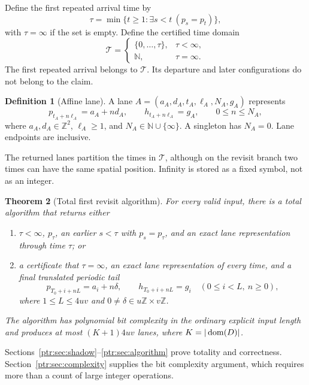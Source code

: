 \documentclass[11pt,letterpaper]{article}
\newtheorem{theorem}{Theorem}[section]
\theoremstyle{definition}\newtheorem{definition}[theorem]{Definition}
\theoremstyle{remark}\newtheorem{remark}[theorem]{Remark}
\newcommand{\Z}{\mathbb Z}\newcommand{\N}{\mathbb N}\newcommand{\Zp}{\mathbb Z_{>0}}
\begin{document}
Define the first repeated arrival time by
\begin{equation}\label{ptr:eq:tau}
 \tau=\min\{t\ge1:\exists s<t\ (p_s=p_t)\},
\end{equation}
with $\tau=\infty$ if the set is empty. Define the certified time domain
\[
 \mathcal T=\begin{cases}\{0,\ldots,\tau\},&\tau<\infty,\\
 \N,&\tau=\infty.
 \end{cases}
\]
The first repeated arrival belongs to $\mathcal T$. Its departure and later configurations do not belong to the claim.

\begin{definition}[Affine lane]\label{ptr:def:lane}
A lane $A=(a_A,d_A,t_A,\ell_A,N_A,g_A)$ represents
\[
 p_{t_A+n\ell_A}=a_A+n d_A,\qquad h_{t_A+n\ell_A}=g_A,
 \qquad 0\le n\le N_A,
\]
where $a_A,d_A\in\Z^2$, $\ell_A\ge1$, and $N_A\in\N\cup\{\infty\}$. A singleton has $N_A=0$. Lane endpoints are inclusive.
\end{definition}
The returned lanes partition the times in $\mathcal T$, although on the revisit branch two times can have the same spatial position. Infinity is stored as a fixed symbol, not as an integer.

\begin{theorem}[Total first revisit algorithm]\label{ptr:thm:main}
For every valid input, there is a total algorithm that returns either
\begin{enumerate}
\item $\tau<\infty$, $p_\tau$, an earlier $s<\tau$ with $p_s=p_\tau$, and an exact lane representation through time $\tau$; or
\item a certificate that $\tau=\infty$, an exact lane representation of every time, and a final translated periodic tail
\begin{equation}\label{ptr:eq:tail}
 p_{T_0+i+nL}=a_i+n\delta,\qquad h_{T_0+i+nL}=g_i
 \quad(0\le i<L,\ n\ge0),
\end{equation}
where $1\le L\le4uv$ and $0\ne\delta\in u\Z\times v\Z$.
\end{enumerate}
The algorithm has polynomial bit complexity in the ordinary explicit input length and produces at most $(K+1)4uv$ lanes, where $K=|\operatorname{dom}(D)|$.
\end{theorem}
Sections~\ref{ptr:sec:shadow}--\ref{ptr:sec:algorithm} prove totality and correctness. Section~\ref{ptr:sec:complexity} supplies the bit complexity argument, which requires more than a count of large integer operations.
\end{document}
